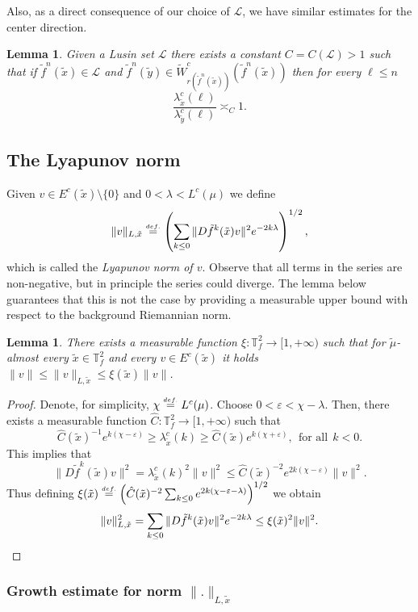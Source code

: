 \documentclass[a4paper,11pt,reqno]{amsart}
\def\tW{\widetilde W}
\newcommand{\TTf}{{\mathbb{T}_f^2}}
\newcommand{\cL}{{\mathcal L}}
\newcommand{\eps}{\varepsilon}
\newcommand{\eqdef}{\stackrel{\scriptscriptstyle\textrm def.}{=}}
\newcommand{\tix}{\tilde{x}}
\newcommand{\tif}{\tilde{f}}
\newtheorem{lemma}[theorem]{Lemma}
\theoremstyle{definition}
\begin{document}
Also, as a direct consequence of our choice of $\mathcal{L}$, we have similar estimates for the center direction.

\begin{lemma}
    \label{lem:distorlusin}
Given a Lusin set $\cL$ there exists a constant $C=C(\cL)>1$ such that if $\tif^n(\tix)\in\cL$ and $\tif^n(\tilde{y})\in \tW^c_{r(\tif^n(\tix))}(\tif^n(\tix))$ then for every $\ell\leq n$
\[
\frac{\lambda^c_{\tix}(\ell)}{\lambda^c_{\tilde{y}}(\ell)}\asymp_{C}1.
\]
\end{lemma}

\subsection{The Lyapunov norm}

Given $v\in E^c(\tix)\setminus\{0\}$ and $0< \lambda < L^c(\mu)$ we define
\[
\|v\|_{L,\tix}\eqdef \left(\sum_{k\leq 0}\|D\tif^k(\tix)v\|^2e^{-2k\lambda}\right)^{1/2},
\]
which is called the \emph{Lyapunov norm of $v$}. Observe that all terms in the series are non-negative, but in principle the series could diverge. The lemma below guarantees that this is not the case by providing a measurable upper bound with respect to the background Riemannian norm. 

\begin{lemma}
    \label{lem:lyapunovriemmann}
There exists a measurable function $\xi:\TTf\to [1,+\infty)$ such that for $\tilde{\mu}$-almost every $\tix\in\TTf$ and every $v\in E^c(\tix)$ it holds
$\|v\|\leq\|v\|_{L,\tix}\leq\xi(\tix)\|v\|$.
\end{lemma}
\begin{proof}
Denote, for simplicity, $\chi\eqdef L^c(\mu)$. Choose $0<\eps<\chi-\lambda$. Then, there exists a measurable function $\hat{C}:\TTf\to[1,+\infty)$ such that 
\[
\hat{C}(\tix)^{-1}e^{k(\chi-\eps)}\geq\lambda^c_{\tix}(k)\geq \hat{C}(\tix)e^{k(\chi+\varepsilon)},\:\:\textrm{for all}\:\:k<0.
\]
This implies that 
\[
\|D\tif^k(\tix)v\|^2=\lambda^c_{\tix}(k)^2\|v\|^2\leq \hat{C}(\tix)^{-2}e^{2k(\chi-\eps)}\|v\|^2.
\]
Thus defining $\xi(\tix)\eqdef \left(\hat{C}(\tix)^{-2}\sum_{k\leq 0}e^{2k(\chi-\eps-\lambda)}\right)^{1/2}$ we obtain
\[
\|v\|^2_{L,\tix}=\sum_{k\leq 0}\|D\tif^k(\tix)v\|^2e^{-2k\lambda}\leq\xi(\tix)^2\|v\|^2. \qedhere
\]
\end{proof}

\subsubsection{Growth estimate for norm $\|.\|_{L,\tix}$}
\end{document}
